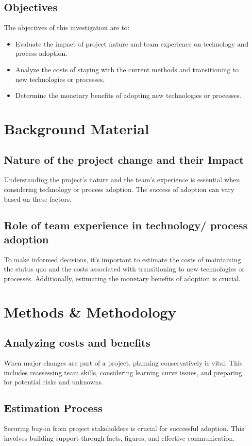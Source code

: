 \documentclass{article}
\begin{document}
\subsection{Objectives}
The objectives of this investigation are to:
\begin{itemize}
  \item Evaluate the impact of project nature and team experience on technology and process adoption.
  \item Analyze the costs of staying with the current methods and transitioning to new technologies or processes.
  \item Determine the monetary benefits of adopting new technologies or processes.
\end{itemize}

\section{Background Material}
\subsection{Nature of the project change and their Impact}
Understanding the project's nature and the team's experience is essential when considering technology or process adoption. The success of adoption can vary based on these factors.
\subsection{Role of team experience in technology/ process adoption}
To make informed decisions, it's important to estimate the costs of maintaining the status quo and the costs associated with transitioning to new technologies or processes. Additionally, estimating the monetary benefits of adoption is crucial.

\section{Methods \& Methodology}
\subsection{Analyzing costs and benefits}
When major changes are part of a project, planning conservatively is vital. This includes reassessing team skills, considering learning curve issues, and preparing for potential risks and unknowns.
\subsection{Estimation Process}
Securing buy-in from project stakeholders is crucial for successful adoption. This involves building support through facts, figures, and effective communication.
\end{document}
